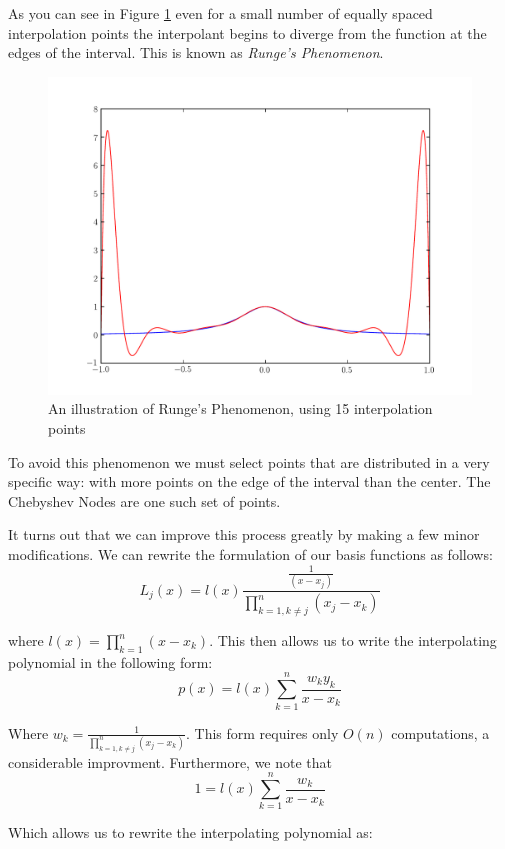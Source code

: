 As you can see in Figure \ref{Fig:Runge} even for a small number of equally spaced interpolation points the interpolant begins to diverge from the function at the edges of the interval. This is known as \emph{Runge's Phenomenon}.

\begin{figure}
\begin{center}
\includegraphics[scale = .5]{./Figures/Runge.pdf}
\caption{An illustration of Runge's Phenomenon, using 15 interpolation points}
\label{Fig:Runge}
\end{center}
\end{figure}


To avoid this phenomenon we must select points that are distributed in a very specific way: with more points on the edge of the interval than the center. The Chebyshev Nodes are one such set of points.

It turns out that we can improve this process greatly by making a few minor modifications. We can rewrite the formulation of our basis functions as follows:
\[
L_j(x) = l(x)\frac{\frac{1}{(x-x_j)}}{\displaystyle\prod_{k=1, k \neq j}^n (x_j-x_k)}
\]

where $l(x) = \prod_{k=1}^n (x-x_k)$. This then allows us to write the interpolating polynomial in the following form:
\[
p(x) = l(x) \sum_{k=1}^n \frac{w_k y_k}{x-x_k}
\]

Where $w_k = \frac{1}{\prod_{k=1, k \neq j}^n (x_j-x_k)}$. This form requires only $O(n)$ computations, a considerable improvment. Furthermore, we note that
\[
1 = l(x) \sum_{k=1}^n \frac{w_k}{x-x_k}
\]

Which allows us to rewrite the interpolating polynomial as:

